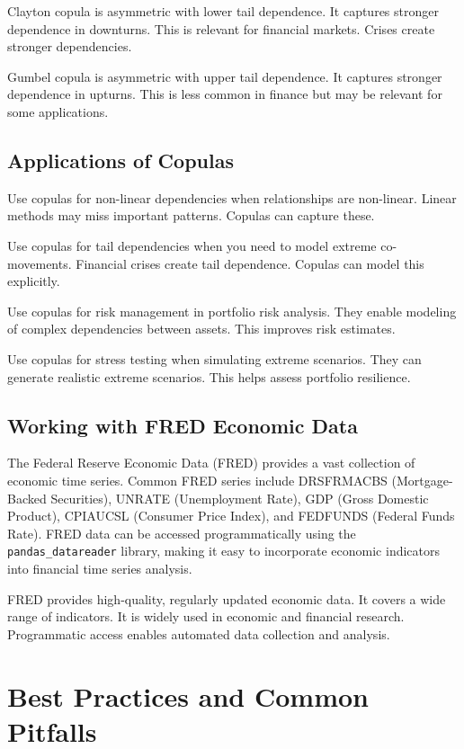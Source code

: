 Clayton copula is asymmetric with lower tail dependence. It captures stronger dependence in downturns. This is relevant for financial markets. Crises create stronger dependencies.

Gumbel copula is asymmetric with upper tail dependence. It captures stronger dependence in upturns. This is less common in finance but may be relevant for some applications.

\subsection{Applications of Copulas}

Use copulas for non-linear dependencies when relationships are non-linear. Linear methods may miss important patterns. Copulas can capture these.

Use copulas for tail dependencies when you need to model extreme co-movements. Financial crises create tail dependence. Copulas can model this explicitly.

Use copulas for risk management in portfolio risk analysis. They enable modeling of complex dependencies between assets. This improves risk estimates.

Use copulas for stress testing when simulating extreme scenarios. They can generate realistic extreme scenarios. This helps assess portfolio resilience.

\subsection{Working with FRED Economic Data}

The Federal Reserve Economic Data (FRED) provides a vast collection of economic time series. Common FRED series include DRSFRMACBS (Mortgage-Backed Securities), UNRATE (Unemployment Rate), GDP (Gross Domestic Product), CPIAUCSL (Consumer Price Index), and FEDFUNDS (Federal Funds Rate). FRED data can be accessed programmatically using the \texttt{pandas\_datareader} library, making it easy to incorporate economic indicators into financial time series analysis.

FRED provides high-quality, regularly updated economic data. It covers a wide range of indicators. It is widely used in economic and financial research. Programmatic access enables automated data collection and analysis.



\section{Best Practices and Common Pitfalls}

